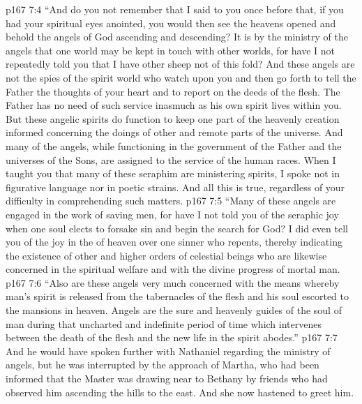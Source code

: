 \vs p167 7:4 \textcolor{ubdarkred}{“And do you not remember that I said to you once before that, if you had your spiritual eyes anointed, you would then see the heavens opened and behold the angels of God ascending and descending? It is by the ministry of the angels that one world may be kept in touch with other worlds, for have I not repeatedly told you that I have other sheep not of this fold? And these angels are not the spies of the spirit world who watch upon you and then go forth to tell the Father the thoughts of your heart and to report on the deeds of the flesh. The Father has no need of such service inasmuch as his own spirit lives within you. But these angelic spirits do function to keep one part of the heavenly creation informed concerning the doings of other and remote parts of the universe. And many of the angels, while functioning in the government of the Father and the universes of the Sons, are assigned to the service of the human races. When I taught you that many of these seraphim are ministering spirits, I spoke not in figurative language nor in poetic strains. And all this is true, regardless of your difficulty in comprehending such matters.}\plusone
\vs p167 7:5 \textcolor{ubdarkred}{“Many of these angels are engaged in the work of saving men, for have I not told you of the seraphic joy when one soul elects to forsake sin and begin the search for God? I did even tell you of the joy in the  of heaven over one sinner who repents, thereby indicating the existence of other and higher orders of celestial beings who are likewise concerned in the spiritual welfare and with the divine progress of mortal man.}
\vs p167 7:6 \textcolor{ubdarkred}{“Also are these angels very much concerned with the means whereby man’s spirit is released from the tabernacles of the flesh and his soul escorted to the mansions in heaven. Angels are the sure and heavenly guides of the soul of man during that uncharted and indefinite period of time which intervenes between the death of the flesh and the new life in the spirit abodes.”}
\pc \vs p167 7:7 And he would have spoken further with Nathaniel regarding the ministry of angels, but he was interrupted by the approach of Martha, who had been informed that the Master was drawing near to Bethany by friends who had observed him ascending the hills to the east. And she now hastened to greet him.
